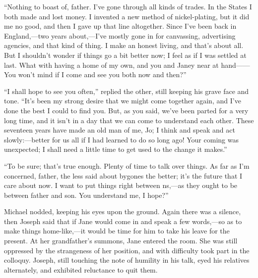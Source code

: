 ``Nothing to boast of, father. I've gone through all kinds of trades. In
the States I both made and lost money. I invented a new method of
nickel-plating, but it did me no good, and then I gave up that line
altogether. Since I've been back in England,---two years about,---I've
mostly gone in for canvassing, {}advertising agencies, and that kind of
thing. I make an honest living, and that's about all. But I shouldn't
wonder if things go a bit better now; I feel as if I was settled at
last. What with having a home of my own, and you and Janey near at
hand{{------}} You won't mind if I come and see you both now and then?''

``I shall hope to see you often,'' replied the other, still keeping his
grave face and tone. ``It's been my strong desire that we might come
together again, and I've done the best I could to find you. But, as you
said, we've been parted for a very long time, and it isn't in a day that
we can come to understand each other. These seventeen years have made an
old man of me, Jo; I think and speak and act slowly:---better for us all
if I had learned to do so long ago! Your coming was unexpected; I shall
need a little time to get used to the change it makes.''

``To be sure; that's true enough. Plenty of time to talk over things. As
far as I'm concerned, father, the less said about bygones {}the better;
it's the future that I care about now. I want to put things right
between ns,---as they ought to be between father and son. You understand
me, I hope?''

Michael nodded, keeping his eyes upon the ground. Again there was a
silence, then Joseph said that if Jane would come in and speak a few
words,---so as to make things home-like,---it would be time for him to
take his leave for the present. At her grandfather's summons, Jane
entered the room. She was still oppressed by the strangeness of her
position, and with difficulty took part in the colloquy. Joseph, still
touching the note of humility in his talk, eyed his relatives
alternately, and exhibited reluctance to quit them.


